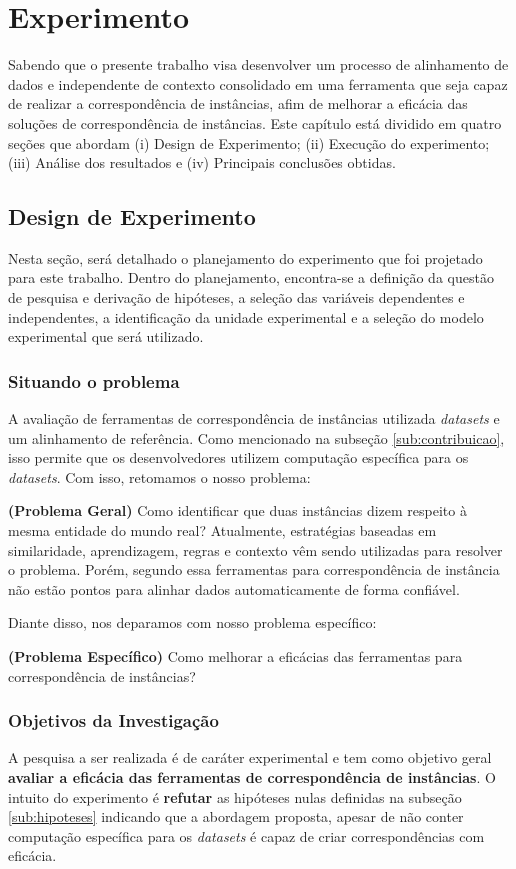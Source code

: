 \chapter{Experimento}
\label{cap:experimento}
Sabendo que o presente trabalho visa desenvolver um processo de alinhamento de dados  e  independente de contexto consolidado em uma ferramenta que seja capaz de realizar a correspondência de instâncias, afim de melhorar a eficácia das soluções de correspondência de instâncias. Este capítulo está dividido em quatro seções que abordam (i) Design de Experimento; (ii) Execução do experimento; (iii) Análise dos resultados e (iv) Principais conclusões obtidas.

\section{Design de Experimento}
Nesta seção, será detalhado o planejamento do experimento que foi projetado para este trabalho. Dentro do planejamento, encontra-se a definição da questão de pesquisa e derivação de hipóteses, a seleção das variáveis dependentes e independentes, a identificação da unidade experimental e a seleção do modelo experimental que será utilizado.

\subsection{Situando o problema}
A avaliação de ferramentas de correspondência de instâncias utilizada \textit{datasets} e um alinhamento de referência. Como mencionado na subseção \ref{sub:contribuicao}, isso permite que os desenvolvedores utilizem computação específica para os \textit{datasets}. Com isso, retomamos o nosso problema:

\textbf{(Problema Geral)} Como identificar que duas instâncias dizem respeito à mesma entidade do mundo real?
Atualmente, estratégias baseadas em similaridade, aprendizagem, regras e contexto \cite{Castano2011} vêm sendo utilizadas para resolver o problema. Porém, segundo  essa ferramentas para correspondência de instância não estão pontos para alinhar dados automaticamente de forma confiável. 

Diante disso, nos deparamos com nosso problema específico: 

\textbf{(Problema Específico)} Como melhorar a eficácias das ferramentas para correspondência de instâncias?

\subsection{Objetivos da Investigação}
A pesquisa a ser realizada é de caráter experimental e tem como objetivo geral \textbf{avaliar a eficácia das ferramentas de correspondência de instâncias}. O intuito do experimento é \textbf{refutar} as hipóteses nulas definidas na subseção \ref{sub:hipoteses} indicando que a abordagem proposta, apesar de não conter computação específica para os \textit{datasets} é capaz de criar correspondências com eficácia.

